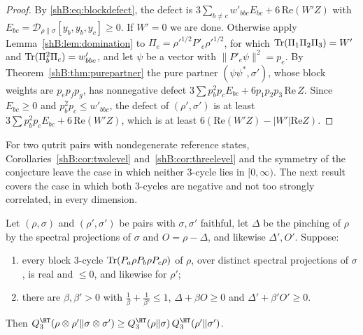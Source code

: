 \begin{proof}
By \eqref{shB:eq:blockdefect}, the defect is $3\sum_{b\ne c}w'_{bbc}E_{bc}+6\,\mathrm{Re}(W'Z)$ with $E_{bc}=\mathcal D_{\rho\|\sigma}[y_b,y_b,y_c]\ge0$. If $W'=0$ we are done. Otherwise apply Lemma~\ref{shB:lem:domination} to $\Pi_e=\rho'^{1/2}P'_e\rho'^{1/2}$, for which $\operatorname{Tr}(\Pi_1\Pi_2\Pi_3)=W'$ and $\operatorname{Tr}(\Pi_b^2\Pi_c)=w'_{bbc}$, and let $\psi$ be a vector with $\|P'_e\psi\|^2=p_e$. By Theorem~\ref{shB:thm:purepartner} the pure partner $(\psi\psi^*,\sigma')$, whose block weights are $p_ep_fp_g$, has nonnegative defect $3\sum p_b^2p_cE_{bc}+6p_1p_2p_3\,\mathrm{Re}\,Z$. Since $E_{bc}\ge0$ and $p_b^2p_c\le w'_{bbc}$, the defect of $(\rho',\sigma')$ is at least $3\sum p_b^2p_cE_{bc}+6\,\mathrm{Re}(W'Z)$, which is at least $6(\mathrm{Re}(W'Z)-|W'|\mathrm{Re}Z)$.
\end{proof}

For two qutrit pairs with nondegenerate reference states, Corollaries~\ref{shB:cor:twolevel} and~\ref{shB:cor:threelevel} and the symmetry of the conjecture leave the case in which neither $3$-cycle lies in $[0,\infty)$. The next result covers the case in which both $3$-cycles are negative and not too strongly correlated, in every dimension.

\begin{theorem}\label{shB:thm:doubling}
Let $(\rho,\sigma)$ and $(\rho',\sigma')$ be pairs with $\sigma,\sigma'$ faithful, let $\Delta$ be the pinching of $\rho$ by the spectral projections of $\sigma$ and $O=\rho-\Delta$, and likewise $\Delta',O'$. Suppose:
\begin{enumerate}[label=(\roman*)]
\item every block $3$-cycle $\operatorname{Tr}(P_a\rho P_b\rho P_c\rho)$ of $\rho$, over distinct spectral projections of $\sigma$, is real and $\le0$, and likewise for $\rho'$;
\item there are $\beta,\beta'>0$ with $\frac1\beta+\frac1{\beta'}\le1$, $\Delta+\beta O\ge0$ and $\Delta'+\beta'O'\ge0$.
\end{enumerate}
Then $Q^\HT_3(\rho\otimes\rho'\|\sigma\otimes\sigma')\ge Q^\HT_3(\rho\|\sigma)\,Q^\HT_3(\rho'\|\sigma')$.
\end{theorem}

